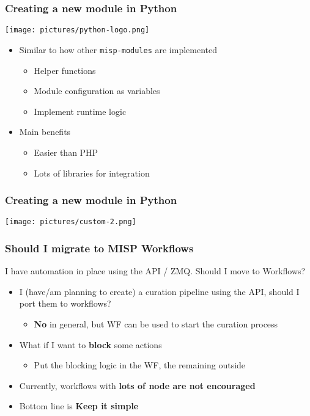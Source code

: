 \begin{frame}
    \frametitle{Creating a new module in Python}
    \begin{center}
        \texttt{[image: pictures/python-logo.png]}
    \end{center}
    \begin{itemize}
        \item Similar to how other \texttt{misp-modules} are implemented
        \begin{itemize}
            \item Helper functions
            \item Module configuration as variables
            \item Implement runtime logic
        \end{itemize}
        \item Main benefits
        \begin{itemize}
            \item Easier than PHP
            \item Lots of libraries for integration
        \end{itemize}
    \end{itemize}
\end{frame}

\begin{frame}
    \frametitle{Creating a new module in Python}
    \begin{center}
        \texttt{[image: pictures/custom-2.png]}
    \end{center}
\end{frame}

\begin{frame}
    \frametitle{Should I migrate to MISP Workflows}
    I have automation in place using the API / ZMQ. Should I move to Workflows?
    \vspace{1em}
    \begin{itemize}
        \item I (have/am planning to create) a curation pipeline using the API, should I port them to workflows?
        \begin{itemize}
            \item \textbf{No} in general, but WF can be used to start the curation process
        \end{itemize}
        \item What if I want to \textbf{block} some actions
        \begin{itemize}
            \item Put the blocking logic in the WF, the remaining outside
        \end{itemize}
        \item Currently, workflows with \textbf{ lots of node are not encouraged}
        \item Bottom line is \textbf{Keep it simple}
    \end{itemize}
\end{frame}

